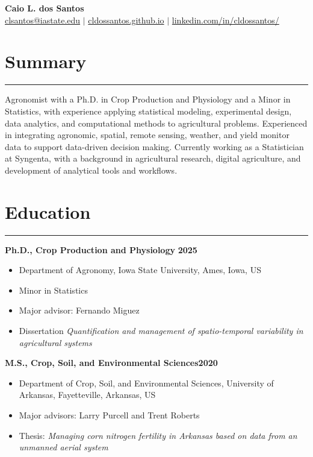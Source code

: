 \documentclass[letterpaper,10pt]{article}
\begin{document}
\begin{center}
	\textbf{\huge Caio L. dos Santos}\\
  \href{mailto:clsantos@iastate.edu}{clsantos@iastate.edu}
  $|$
    \href{https://cldossantos.github.io/}{cldossantos.github.io}
    $|$
	\href{https://www.linkedin.com/in/cldossantos/}{linkedin.com/in/cldossantos/}
\end{center}

\vspace{0.1in} \section*{\sc  Summary} \hrule
\vspace{.1in} 


Agronomist with a Ph.D. in Crop Production and
Physiology and a Minor in Statistics, with
experience applying statistical modeling,
experimental design, data analytics, and
computational methods to agricultural problems.
Experienced in integrating agronomic, spatial,
remote sensing, weather, and yield monitor data to
support data-driven decision making.  Currently
working as a Statistician at Syngenta, with a
background in agricultural research, digital
agriculture, and development of analytical tools
and workflows.


\section*{ \sc  Education}
\hrule
\vspace{.1in}

{\bf Ph.D., Crop Production and Physiology} \hfill
{\bf 2025}
\vspace{-.08in}
\begin{itemize}
\itemsep-0.1em
\renewcommand\labelitemi{{\boldmath$\cdot$}}
\item  Department of Agronomy, Iowa State University, Ames, Iowa, US
\item Minor in Statistics
\item Major advisor:  Fernando Miguez
\item Dissertation \textit{Quantification and management of spatio-temporal variability in agricultural systems}
\end{itemize}

{\bf M.S., Crop, Soil, and Environmental Sciences}\hfill  {\bf 2020}
\vspace{-.08in}
\begin{itemize}
\renewcommand\labelitemi{{\boldmath$\cdot$}}
\itemsep-0.1em
\item 
Department of Crop, Soil, and Environmental
Sciences, University of Arkansas, Fayetteville, Arkansas, US
\item Major advisors: Larry Purcell and Trent Roberts
\item Thesis: \textit{Managing corn nitrogen fertility in Arkansas based on data from an unmanned aerial system}
\end{itemize}
\end{document}
